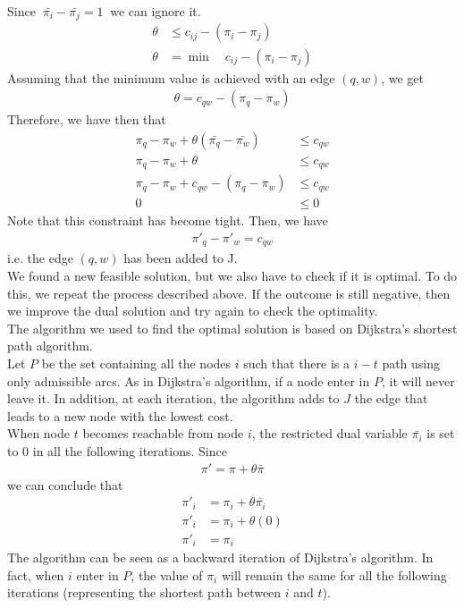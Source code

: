 \documentclass[a4paper,11pt]{article}
\begin{document}
Since $\ \bar{\pi_i} - \bar{\pi_j} = 1 \ $ we can ignore it.
\begin{align*}
	\theta &\le c_{ij} - (\pi_i - \pi_j)\\
	\theta &= \min \quad c_{ij} - (\pi_i - \pi_j)
\end{align*}
Assuming that the minimum value is achieved with an edge $(q,w)$, we get
\begin{align*}
	\theta =  c_{qw} - (\pi_q - \pi_w)
\end{align*}
Therefore, we have then that
\begin{align*}
	\pi_q - \pi_w + \theta (\bar{\pi_q} - \bar{\pi_w}) &\le c_{qw}\\
	\pi_q - \pi_w + \theta &\le c_{qw}\\
	\pi_q - \pi_w + c_{qw} - (\pi_q - \pi_w) &\le c_{qw}\\
	0 &\le 0
\end{align*}
Note that this constraint has become tight. Then, we have
\begin{align*}
	\pi'_q - \pi'_w = c_{qw}
\end{align*} 
i.e. the edge $(q,w)$ has been added to J.\\
We found a new feasible solution, but we also have to check if it is optimal. To do this, we repeat the process described above. If the outcome is still negative, then we improve the dual solution and try again to check the optimality. \\

The algorithm we used to find the optimal solution is based on Dijkstra's shortest path algorithm. \\
Let $P$ be the set containing all the nodes $i$ such that there is a $i-t$ path using only admissible arcs. As in Dijkstra's algorithm, if a node enter in $P$, it will never leave it. In addition, at each iteration, the algorithm adds to $J$ the edge that leads to a new node with the lowest cost.\\
When node $t$ becomes reachable from node $i$, the restricted dual variable $ \bar{\pi_i}$ is set to 0 in all the following iterations. Since
\begin{align*}
	\pi' = \pi + \theta \bar{\pi}
\end{align*} 
we can conclude that 
\begin{align*}
\pi'_i &= \pi_i + \theta \bar{\pi_i}\\
\pi'_i &= \pi_i + \theta (0)\\
\pi'_i &= \pi_i
\end{align*} 
The algorithm can be seen as a backward iteration of Dijkstra's algorithm. In fact, when $i$ enter in $P$, the value of $\pi_i$ will remain the same for all the following iterations (representing the shortest path between $i$ and $t$).
\end{document}
